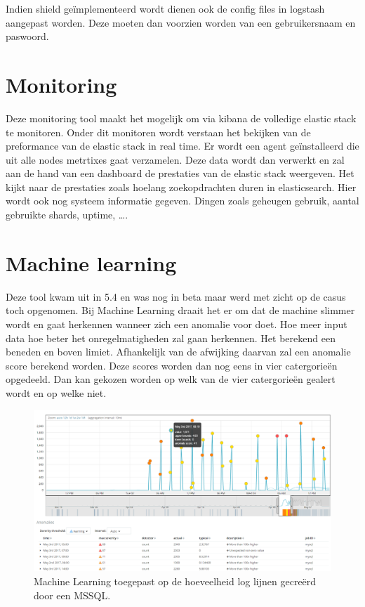 Indien shield geïmplementeerd wordt dienen ook de config files in logstash aangepast worden. Deze moeten dan voorzien worden van een gebruikersnaam en paswoord.

\section{Monitoring}
\label{sec:monitoring}

Deze monitoring tool maakt het mogelijk om via kibana de volledige elastic stack te monitoren. Onder dit monitoren wordt verstaan het bekijken van de preformance van de elastic stack in real time.
Er wordt een agent geïnstalleerd die uit alle nodes metrtixes gaat verzamelen.
Deze data wordt dan verwerkt en zal aan de hand van een dashboard de prestaties van de elastic stack weergeven. 
Het kijkt naar de prestaties zoals hoelang zoekopdrachten duren in elasticsearch. Hier wordt ook nog systeem informatie gegeven. Dingen zoals geheugen gebruik, aantal gebruikte shards, uptime, \dots.

\section{Machine learning}
\label{sec:machine-learning}

Deze tool kwam uit in 5.4 en was nog in beta maar werd met zicht op de casus toch opgenomen.
Bij Machine Learning draait het er om dat de machine slimmer wordt en gaat herkennen wanneer zich een anomalie voor doet. Hoe meer input data hoe beter het onregelmatigheden zal gaan herkennen.
Het berekend een beneden en boven limiet. Afhankelijk van de afwijking daarvan zal een anomalie score berekend worden. Deze scores worden dan nog eens in vier catergorieën opgedeeld. 
Dan kan gekozen worden op welk van de vier catergorieën gealert wordt en op welke niet.
\begin{figure}[h]
	\includegraphics[width=16cm]{img/machinelearning1}
	\caption{Machine Learning toegepast op de hoeveelheid log lijnen gecreërd door een MSSQL.}
	\label{fig:machinelearning1}
\end{figure}


